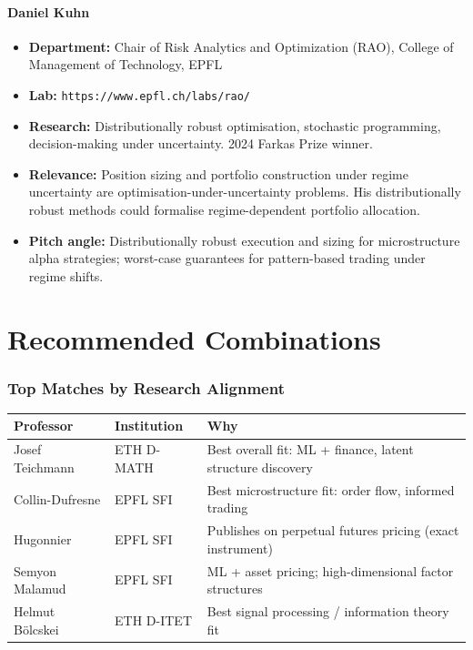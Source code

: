 \documentclass[11pt,a4paper]{article}
\newcommand{\url}[1]{\texttt{#1}}
\begin{document}
\subsection{Daniel Kuhn}
\begin{itemize}
  \item \textbf{Department:} Chair of Risk Analytics and Optimization (RAO), College of Management of Technology, EPFL
  \item \textbf{Lab:} \url{https://www.epfl.ch/labs/rao/}
  \item \textbf{Research:} Distributionally robust optimisation, stochastic programming, decision-making under uncertainty. 2024 Farkas Prize winner.
  \item \textbf{Relevance:} Position sizing and portfolio construction under regime uncertainty are optimisation-under-uncertainty problems. His distributionally robust methods could formalise regime-dependent portfolio allocation.
  \item \textbf{Pitch angle:} Distributionally robust execution and sizing for microstructure alpha strategies; worst-case guarantees for pattern-based trading under regime shifts.
\end{itemize}

\newpage

\part{Recommended Combinations}

\section{Top Matches by Research Alignment}

\begin{longtable}{@{} p{3.5cm} p{3.5cm} p{7cm} @{}}
\hline
\textbf{Professor} & \textbf{Institution} & \textbf{Why} \\
\hline
Josef Teichmann & ETH D-MATH & Best overall fit: ML + finance, latent structure discovery \\
Collin-Dufresne & EPFL SFI & Best microstructure fit: order flow, informed trading \\
Hugonnier & EPFL SFI & Publishes on perpetual futures pricing (exact instrument) \\
Semyon Malamud & EPFL SFI & ML + asset pricing; high-dimensional factor structures \\
Helmut B\"olcskei & ETH D-ITET & Best signal processing / information theory fit \\
\hline
\end{longtable}
\end{document}
